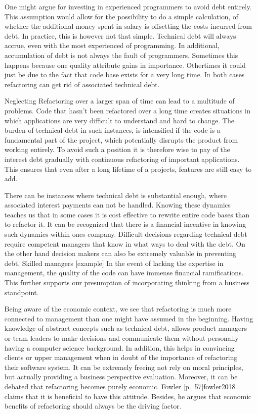 One might argue for investing in experienced programmers to avoid debt entirely. 
This assumption would allow for the possibility 
	to do a simple calculation, 
	of whether the additional money spent in salary 
	is offsetting the costs incurred from debt.
In practice, this is however not that simple.
Technical debt will always accrue, 
	even with the most experienced of programming.
In additional, accumulation of debt is not always the fault of programmers.
Sometimes this happens because one quality attribute gains in importance. 
Othertimes it could just be due to the fact 
	that code base exists for a very long time. 
In both cases refactoring can get rid of associated technical debt. 

Neglecting Refactoring over a larger span of time can lead to a multitude of problems. Code that hasn't been refactored over a long time creates situations in which applications are very difficult to understand and hard to change.
The burden of technical debt in such instances, is intensified if the code is a fundamental part of the project, which potentially disrupts the product from working entirely.
To avoid such a position it is therefore wise to pay of the interest debt gradually with continuous refactoring of important applications. This ensures that even after a long lifetime of a projects, features are still easy to add.

There can be instances where technical debt is substantial enough, 
	where associated interest payments can not be handled. 
Knowing these dynamics teaches us 
	that in some cases it is cost effective to 
	rewrite entire code bases than to refactor it.  
It can be recognized that there is a financial incentive in 
	knowing such dynamics within ones company.
Difficult decisions regarding technical debt require 
	competent managers that know in what ways to deal with the debt. 
On the other hand decision makers can 
	also be extremely valuable in preventing debt. 
Skilled managers [example]
In the event of lacking the expertise in management, 
	the quality of the code can have immense financial ramifications. 
This further supports our presumption of 
	incorporating thinking from a business standpoint.

Being aware of the economic context, 
	we see that refactoring is much more connected to management than one
	might have assumed in the beginning. 
Having knowledge of abstract concepts such as technical debt,
	allows product managers or team leaders 
	to make decisions and communicate them without personally 
	having a computer science background. 
In addition, 
	this helps in convincing clients or upper management 
	when in doubt of the importance of refactoring their software system.
It can be extremely freeing not rely on moral principles, 
	but actually providing a business perspective evaluation.
Moreover, it can be debated that refactoring becomes purely economic.
Fowler [p.~57]{fowler2018} claims 
	that it is beneficial to have this attitude. 
Besides, he argues that economic benefits of refactoring 
	should always be the driving factor.

